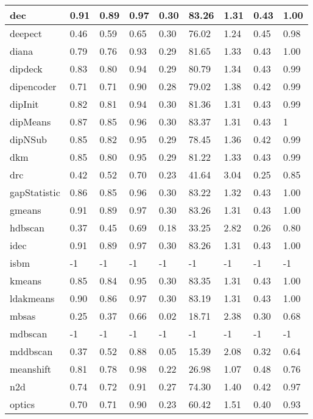 \begin{table}[H]
\begin{tabular}{|l|l|l|l|l|l|l|l|l|}
\hline
dec & 0.91 & 0.89 & 0.97 & 0.30 & 83.26 & 1.31 & 0.43 & 1.00 \\
\hline
deepect & 0.46 & 0.59 & 0.65 & 0.30 & 76.02 & 1.24 & 0.45 & 0.98 \\
\hline
diana & 0.79 & 0.76 & 0.93 & 0.29 & 81.65 & 1.33 & 0.43 & 1.00 \\
\hline
dipdeck & 0.83 & 0.80 & 0.94 & 0.29 & 80.79 & 1.34 & 0.43 & 0.99 \\
\hline
dipencoder & 0.71 & 0.71 & 0.90 & 0.28 & 79.02 & 1.38 & 0.42 & 0.99 \\
\hline
dipInit & 0.82 & 0.81 & 0.94 & 0.30 & 81.36 & 1.31 & 0.43 & 0.99 \\
\hline
dipMeans & 0.87 & 0.85 & 0.96 & 0.30 & 83.37 & 1.31 & 0.43 & 1 \\
\hline
dipNSub & 0.85 & 0.82 & 0.95 & 0.29 & 78.45 & 1.36 & 0.42 & 0.99 \\
\hline
dkm & 0.85 & 0.80 & 0.95 & 0.29 & 81.22 & 1.33 & 0.43 & 0.99 \\
\hline
drc & 0.42 & 0.52 & 0.70 & 0.23 & 41.64 & 3.04 & 0.25 & 0.85 \\
\hline
gapStatistic & 0.86 & 0.85 & 0.96 & 0.30 & 83.22 & 1.32 & 0.43 & 1.00 \\
\hline
gmeans & 0.91 & 0.89 & 0.97 & 0.30 & 83.26 & 1.31 & 0.43 & 1.00 \\
\hline
hdbscan & 0.37 & 0.45 & 0.69 & 0.18 & 33.25 & 2.82 & 0.26 & 0.80 \\
\hline
idec & 0.91 & 0.89 & 0.97 & 0.30 & 83.26 & 1.31 & 0.43 & 1.00 \\
\hline
isbm & -1 & -1 & -1 & -1 & -1 & -1 & -1 & -1 \\
\hline
kmeans & 0.85 & 0.84 & 0.95 & 0.30 & 83.35 & 1.31 & 0.43 & 1.00 \\
\hline
ldakmeans & 0.90 & 0.86 & 0.97 & 0.30 & 83.19 & 1.31 & 0.43 & 1.00 \\
\hline
mbsas & 0.25 & 0.37 & 0.66 & 0.02 & 18.71 & 2.38 & 0.30 & 0.68 \\
\hline
mdbscan & -1 & -1 & -1 & -1 & -1 & -1 & -1 & -1 \\
\hline
mddbscan & 0.37 & 0.52 & 0.88 & 0.05 & 15.39 & 2.08 & 0.32 & 0.64 \\
\hline
meanshift & 0.81 & 0.78 & 0.98 & 0.22 & 26.98 & 1.07 & 0.48 & 0.76 \\
\hline
n2d & 0.74 & 0.72 & 0.91 & 0.27 & 74.30 & 1.40 & 0.42 & 0.97 \\
\hline
optics & 0.70 & 0.71 & 0.90 & 0.23 & 60.42 & 1.51 & 0.40 & 0.93 \\
\hline

\end{tabular}
\end{table}
